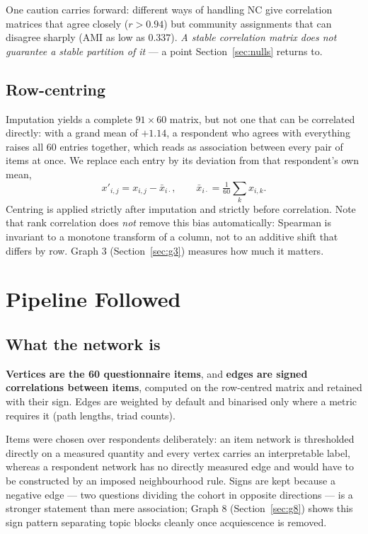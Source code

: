 \documentclass{article}
\begin{document}
One caution carries forward: different ways of handling NC give correlation
matrices that agree closely ($r>0.94$) but community assignments that can
disagree sharply (AMI as low as $0.337$). \emph{A stable correlation matrix
does not guarantee a stable partition of it} --- a point
Section~\ref{sec:nulls} returns to.

\subsection{Row-centring}
\label{sec:centring}

Imputation yields a complete $91\times 60$ matrix, but not one that can be
correlated directly: with a grand mean of $+1.14$, a respondent who agrees with
everything raises all 60 entries together, which reads as association between
every pair of items at once. We replace each entry by its deviation from that
respondent's own mean,
\begin{equation}
x'_{i,j} = x_{i,j} - \bar{x}_{i\cdot},
\qquad
\bar{x}_{i\cdot} = \tfrac{1}{60}\textstyle\sum_{k} x_{i,k}.
\end{equation}
Centring is applied strictly after imputation and strictly before correlation.
Note that rank correlation does \emph{not} remove this bias automatically:
Spearman is invariant to a monotone transform of a column, not to an additive
shift that differs by row. Graph 3 (Section~\ref{sec:g3}) measures how much it
matters.

\section{Pipeline Followed}
\label{sec:pipeline}

\subsection{What the network is}
\label{sec:network}

\textbf{Vertices are the 60 questionnaire items}, and \textbf{edges are signed
correlations between items}, computed on the row-centred matrix and retained
with their sign. Edges are weighted by default and binarised only where a
metric requires it (path lengths, triad counts).

Items were chosen over respondents deliberately: an item network is thresholded
directly on a measured quantity and every vertex carries an interpretable
label, whereas a respondent network has no directly measured edge and would
have to be constructed by an imposed neighbourhood rule. Signs are kept because
a negative edge --- two questions dividing the cohort in opposite directions
--- is a stronger statement than mere association; Graph 8
(Section~\ref{sec:g8}) shows this sign pattern separating topic blocks cleanly
once acquiescence is removed.
\end{document}
